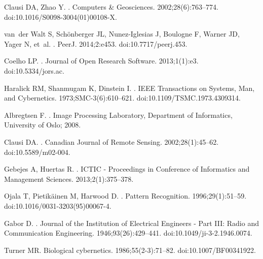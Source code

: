 \documentclass[10pt,letterpaper]{article}
\begin{document}
\begin{thebibliography}{10}
Clausi DA, Zhao Y.
.
\newblock Computers {\&} Geosciences. 2002;28(6):763--774.
\newblock doi:{10.1016/S0098-3004(01)00108-X}.

van~der Walt S, Sch{\"{o}}nberger JL, Nunez-Iglesias J, Boulogne F, Warner JD,
  Yager N, et~al.
.
\newblock PeerJ. 2014;2:e453.
\newblock doi:{10.7717/peerj.453}.

Coelho LP.
.
\newblock Journal of Open Research Software. 2013;1(1):e3.
\newblock doi:{10.5334/jors.ac}.

Haralick RM, Shanmugam K, Dinstein I.
.
\newblock IEEE Transactions on Systems, Man, and Cybernetics.
  1973;SMC-3(6):610--621.
\newblock doi:{10.1109/TSMC.1973.4309314}.

Albregtsen F.
.
\newblock Image Processing Laboratory, Department of Informatics, University of
  Oslo; 2008.

Clausi DA.
.
\newblock Canadian Journal of Remote Sensing. 2002;28(1):45--62.
\newblock doi:{10.5589/m02-004}.

Gebejes A, Huertas R.
.
\newblock ICTIC - Proceedings in Conference of Informatics and Management
  Sciences. 2013;2(1):375--378.

Ojala T, Pietik{\"{a}}inen M, Harwood D.
.
\newblock Pattern Recognition. 1996;29(1):51--59.
\newblock doi:{10.1016/0031-3203(95)00067-4}.

Gabor D.
.
\newblock Journal of the Institution of Electrical Engineers - Part III: Radio
  and Communication Engineering. 1946;93(26):429--441.
\newblock doi:{10.1049/ji-3-2.1946.0074}.

Turner MR.
\newblock Biological cybernetics. 1986;55(2-3):71--82.
\newblock doi:{10.1007/BF00341922}.


\end{thebibliography}
\end{document}
